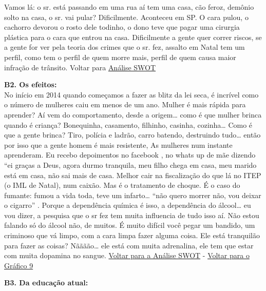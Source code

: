 \documentclass[
	12pt,				%
	openright,			%
	twoside,			%
	a4paper,			%
	chapter=TITLE,		%
	section=TITLE,		%
	subsection=TITLE,	%
	subsubsection=TITLE,%
	spanish,            %
	english,			%
	brazil				%
	]{abntex2}
\begin{document}
\begin{anexosenv}
	Vamos lá: o sr. está passando em uma rua aí tem uma casa, cão feroz, demônio solto na casa, o sr. vai pular? Dificilmente. Aconteceu em SP. O cara pulou, o cachorro devorou o rosto dele todinho, o dono teve que pagar uma cirurgia plástica para o cara que entrou na casa. Dificilmente a gente quer correr riscos, se a gente for ver pela teoria dos crimes que o sr. fez, assalto em Natal tem um perfil, como tem o perfil de quem morre mais, perfil de quem causa maior infração de trânsito. Voltar para \hyperlink{W1}{Análise SWOT}\\
	\hypertarget{B2}{}
	\par
	\textbf{B2. Os efeitos:}\\
	No início em 2014 quando começamos a fazer as blitz da lei seca, é incrível como o número de mulheres caiu em menos de um ano. Mulher é mais rápida para aprender?  Aí vem do comportamento, desde a origem… como é que mulher brinca quando é criança? Bonequinha, casamento, filhinho, casinha, cozinha… Como é que a gente brinca? Tiro, polícia e ladrão, carro batendo, destruindo tudo… então por isso que a gente homem é mais resistente, As mulheres num instante aprenderam. Eu recebo depoimentos no facebook , no whats up de mãe dizendo “ei graças a Deus, agora durmo tranquila, meu filho chega em casa, meu marido está em casa, não sai mais de casa. Melhor cair na fiscalização do que lá no ITEP (o IML de Natal), num caixão. Mas é o tratamento de choque. É o caso do fumante: fumou a vida toda, teve um infarto… “não quero morrer não, vou deixar o cigarro” . Porque a dependência química é isso, a dependência do álcool… eu vou dizer, a pesquisa que o sr fez tem muita influencia de tudo isso aí. Não estou falando só do álcool não, de muitos. É muito difícil você pegar um bandido, um criminoso que vá limpo, com a cara limpa fazer alguma coisa.  Ele está tranquilão para fazer as coisas? Nãããão… ele está com muita adrenalina, ele tem que estar com muita dopamina no sangue. \hyperlink{O2}{Voltar para a Análise SWOT} - \hyperlink{beb2}{Voltar para o Gráfico 9}\\
	\hypertarget{B3}{}
	\par
	\textbf{B3. Da educação atual:}\\

\end{anexosenv}
\end{document}
